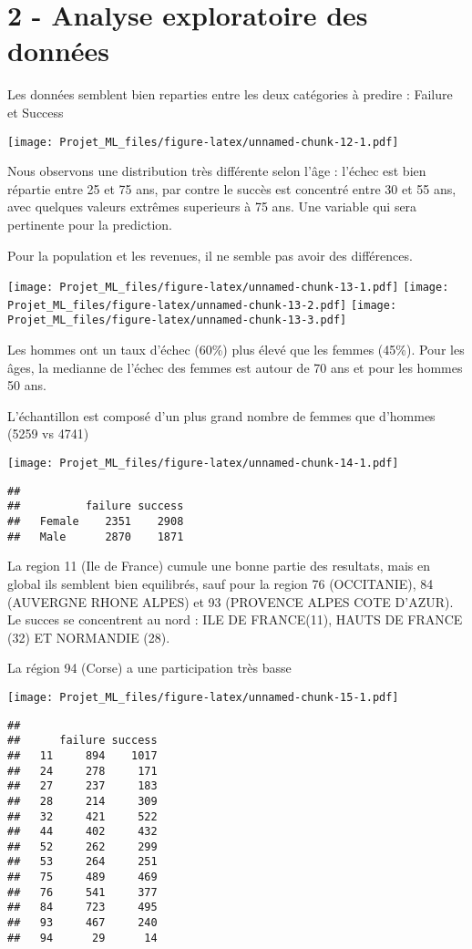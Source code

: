 \documentclass[]{article}
\begin{document}
\section{2 - Analyse exploratoire des
données}\label{analyse-exploratoire-des-donnees}

Les données semblent bien reparties entre les deux catégories à predire
: Failure et Success

\texttt{[image: Projet\_ML\_files/figure-latex/unnamed-chunk-12-1.pdf]}

Nous observons une distribution très différente selon l'âge : l'échec
est bien répartie entre 25 et 75 ans, par contre le succès est concentré
entre 30 et 55 ans, avec quelques valeurs extrêmes superieurs à 75 ans.
Une variable qui sera pertinente pour la prediction.

Pour la population et les revenues, il ne semble pas avoir des
différences.

\texttt{[image: Projet\_ML\_files/figure-latex/unnamed-chunk-13-1.pdf]}
\texttt{[image: Projet\_ML\_files/figure-latex/unnamed-chunk-13-2.pdf]}
\texttt{[image: Projet\_ML\_files/figure-latex/unnamed-chunk-13-3.pdf]}

Les hommes ont un taux d'échec (60\%) plus élevé que les femmes (45\%).
Pour les âges, la medianne de l'échec des femmes est autour de 70 ans et
pour les hommes 50 ans.

L'échantillon est composé d'un plus grand nombre de femmes que d'hommes
(5259 vs 4741)

\texttt{[image: Projet\_ML\_files/figure-latex/unnamed-chunk-14-1.pdf]}

\begin{verbatim}
##         
##          failure success
##   Female    2351    2908
##   Male      2870    1871
\end{verbatim}

La region 11 (Ile de France) cumule une bonne partie des resultats, mais
en global ils semblent bien equilibrés, sauf pour la region 76
(OCCITANIE), 84 (AUVERGNE RHONE ALPES) et 93 (PROVENCE ALPES COTE
D'AZUR). Le succes se concentrent au nord : ILE DE FRANCE(11), HAUTS DE
FRANCE (32) ET NORMANDIE (28).

La région 94 (Corse) a une participation très basse

\texttt{[image: Projet\_ML\_files/figure-latex/unnamed-chunk-15-1.pdf]}

\begin{verbatim}
##     
##      failure success
##   11     894    1017
##   24     278     171
##   27     237     183
##   28     214     309
##   32     421     522
##   44     402     432
##   52     262     299
##   53     264     251
##   75     489     469
##   76     541     377
##   84     723     495
##   93     467     240
##   94      29      14
\end{verbatim}
\end{document}
